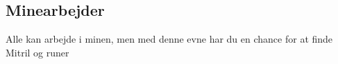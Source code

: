 \subsection*{Minearbejder}
Alle kan arbejde i minen, men med denne evne har du en chance for at finde Mitril og runer